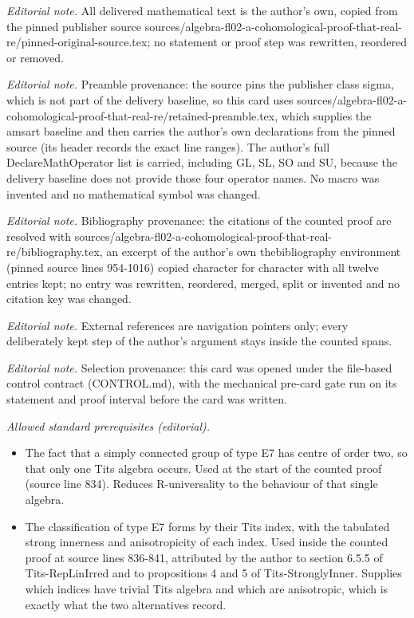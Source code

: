\maketitle
\noindent\textit{Editorial note.} All delivered mathematical text is the author's own, copied from the pinned publisher source sources/algebra-fl02-a-cohomological-proof-that-real-re/pinned-original-source.tex; no statement or proof step was rewritten, reordered or removed.\par\medskip
\noindent\textit{Editorial note.} Preamble provenance: the source pins the publisher class sigma, which is not part of the delivery baseline, so this card uses sources/algebra-fl02-a-cohomological-proof-that-real-re/retained-preamble.tex, which supplies the amsart baseline and then carries the author's own declarations from the pinned source (its header records the exact line ranges). The author's full DeclareMathOperator list is carried, including GL, SL, SO and SU, because the delivery baseline does not provide those four operator names. No macro was invented and no mathematical symbol was changed.\par\medskip
\noindent\textit{Editorial note.} Bibliography provenance: the citations of the counted proof are resolved with sources/algebra-fl02-a-cohomological-proof-that-real-re/bibliography.tex, an excerpt of the author's own thebibliography environment (pinned source lines 954-1016) copied character for character with all twelve entries kept; no entry was rewritten, reordered, merged, split or invented and no citation key was changed.\par\medskip
\noindent\textit{Editorial note.} External references are navigation pointers only; every deliberately kept step of the author's argument stays inside the counted spans.\par\medskip
\noindent\textit{Editorial note.} Selection provenance: this card was opened under the file-based control contract (CONTROL.md), with the mechanical pre-card gate run on its statement and proof interval before the card was written.\par\medskip
\noindent\textit{Allowed standard prerequisites (editorial).}\begin{itemize}
\item The fact that a simply connected group of type E7 has centre of order two, so that only one Tits algebra occurs. Used at the start of the counted proof (source line 834). Reduces R-universality to the behaviour of that single algebra.
\item The classification of type E7 forms by their Tits index, with the tabulated strong innerness and anisotropicity of each index. Used inside the counted proof at source lines 836-841, attributed by the author to section 6.5.5 of Tits-RepLinIrred and to propositions 4 and 5 of Tits-StronglyInner. Supplies which indices have trivial Tits algebra and which are anisotropic, which is exactly what the two alternatives record.
\end{itemize}\medskip
